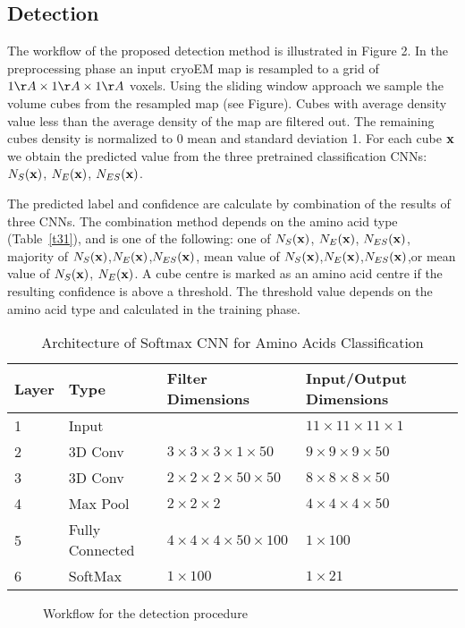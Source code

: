 \subsection{Detection}
The workflow of the  proposed detection method is illustrated in Figure 2.
In the preprocessing phase an input cryoEM map is resampled to a grid of $1 \AA \times 1 \AA \times 1 \AA $ voxels.  
Using the sliding window approach we sample the volume cubes from the resampled map (see Figure).
Cubes with average density value less than the average density of the map are filtered out.
The remaining cubes density is normalized to 0 mean  and standard deviation 1.
For each cube $\mathbf{x}$ we obtain the predicted value from the three pretrained classification CNNs: $N_S(\mathbf{x})$, $N_E(\mathbf{x})$, $N_{ES}(\mathbf{x})$.

The predicted label and confidence are calculate by combination of the results of three CNNs.
The combination method depends on the amino acid type (Table~\ref{t31}), and is one of the following: one of $N_S(\mathbf{x})$, $N_E(\mathbf{x})$, $N_{ES}(\mathbf{x})$, majority of $N_S(\mathbf{x})$,$N_E(\mathbf{x})$,$N_{ES}(\mathbf{x})$, mean value of  $N_S(\mathbf{x})$,$N_E(\mathbf{x})$,$N_{ES}(\mathbf{x})$,or  mean value of  $N_S(\mathbf{x})$, $N_E(\mathbf{x})$.
A cube centre is marked as an amino acid centre if the resulting confidence is above a threshold.  
The threshold value depends on the amino acid type and calculated in the training phase.

\begin{table}
\caption{ Architecture of Softmax CNN for Amino Acids Classification}\label{ta}
\begin{center}
\begin{tabular}{ | m{1.5em} | m{2cm} | m{2.4cm}|m{2.4cm}| }

 \hline
 Layer & Type & Filter Dimensions & Input/Output Dimensions \\
 \hline
 \hline
1 &  Input & & $11 \times 11 \times 11 \times 1 $ \\
\hline
2 &  3D Conv & $3 \times 3 \times 3  \times 1 \times 50 $ & $9 \times 9 \times 9 \times 50 $ \\
\hline
3 &  3D Conv & $2 \times 2 \times 2 \times 50 \times 50 $ & $8 \times 8 \times 8 \times 50 $ \\
\hline
4 &  Max Pool & $2 \times 2 \times 2  $ & $4 \times 4 \times 4 \times 50 $ \\
\hline
5 &  Fully Connected &  $4 \times 4 \times 4 \times 50 \times 100 $ & $1 \times 100 $ \\
\hline
6 &  SoftMax &  $1 \times 100 $ & $1 \times 21 $ \\
\hline

\end{tabular}
\end{center}
\end{table}

\begin{figure}
  \centering
	
  \caption{Workflow for the detection procedure  }\label{f:det_scheme}
\end{figure}
